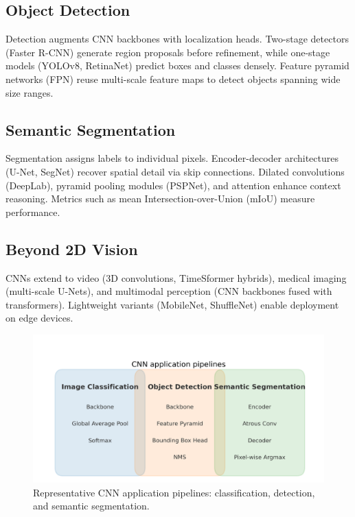 ﻿\documentclass[12pt]{article}
\begin{document}
\subsection{Object Detection}
Detection augments CNN backbones with localization heads. Two-stage detectors (Faster R-CNN) generate region proposals before refinement, while one-stage models (YOLOv8, RetinaNet) predict boxes and classes densely. Feature pyramid networks (FPN) reuse multi-scale feature maps to detect objects spanning wide size ranges.

\subsection{Semantic Segmentation}
Segmentation assigns labels to individual pixels. Encoder-decoder architectures (U-Net, SegNet) recover spatial detail via skip connections. Dilated convolutions (DeepLab), pyramid pooling modules (PSPNet), and attention enhance context reasoning. Metrics such as mean Intersection-over-Union (mIoU) measure performance.

\subsection{Beyond 2D Vision}
CNNs extend to video (3D convolutions, TimeSformer hybrids), medical imaging (multi-scale U-Nets), and multimodal perception (CNN backbones fused with transformers). Lightweight variants (MobileNet, ShuffleNet) enable deployment on edge devices.

\begin{figure}[H]
  \centering
  \includegraphics[width=0.85\linewidth]{cnn_applications_overview.png}
  \caption{Representative CNN application pipelines: classification, detection, and semantic segmentation.}
  \label{fig:cnn_applications}
\end{figure}
\FloatBarrier
\end{document}
